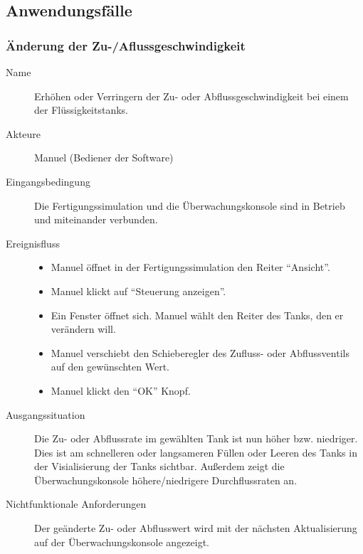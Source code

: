 \documentclass[parskip=full]{scrartcl}
\begin{document}
\subsection{Anwendungsfälle}
\subsubsection{Änderung der Zu-/Aflussgeschwindigkeit}
\begin{description}
 \item[Name] Erhöhen oder Verringern der Zu- oder Abflussgeschwindigkeit bei einem der Flüssigkeitstanks.
 \item[Akteure] Manuel (Bediener der Software)
 \item[Eingangsbedingung] Die Fertigungssimulation und die Überwachungskonsole sind in Betrieb und miteinander verbunden.
 \item[Ereignisfluss]
 \begin{itemize}[noitemsep]
  \item Manuel öffnet in der Fertigungssimulation den Reiter ``Ansicht''.
  \item Manuel klickt auf ``Steuerung anzeigen''.
  \item Ein Fenster öffnet sich. Manuel wählt den Reiter des Tanks, den er verändern will.
  \item Manuel verschiebt den Schieberegler des Zufluss- oder Abflussventils auf den gewünschten Wert.
  \item Manuel klickt den ``OK'' Knopf.
 \end{itemize}
 \item[Ausgangssituation] Die Zu- oder Abflussrate im gewählten Tank ist nun höher bzw. niedriger. Dies ist am schnelleren oder langsameren Füllen oder Leeren des Tanks in der Visialisierung der Tanks sichtbar.
 Außerdem zeigt die Überwachungskonsole höhere/niedrigere Durchflussraten an.
 \item [Nichtfunktionale Anforderungen] Der geänderte Zu- oder Abflusswert wird mit der nächsten Aktualisierung auf der Überwachungskonsole angezeigt.
\end{description}
\end{document}

